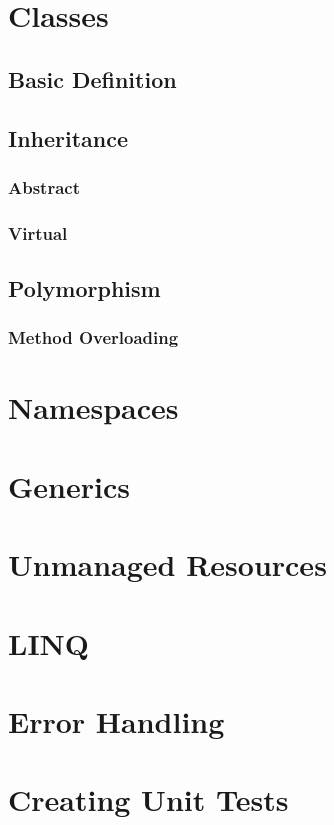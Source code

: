 \documentclass {amsart}
\begin{document}
\section{Classes}
	\subsection{Basic Definition}
	\subsection{Inheritance}
		\subsubsection{Abstract}
		\subsubsection{Virtual}
	\subsection{Polymorphism}
		\subsubsection{Method Overloading}


\section{Namespaces}

\section{Generics}

\section{Unmanaged Resources}

\section{LINQ}

\section{Error Handling}

\section{Creating Unit Tests}
\end{document}
